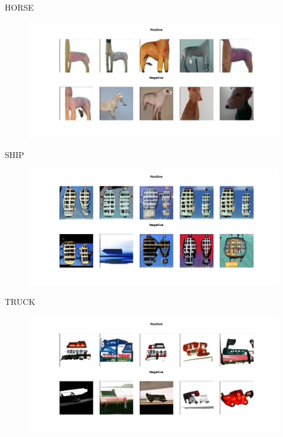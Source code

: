\documentclass[12pt,a4paper,openany]{book}
\begin{document}
\newline
HORSE
\begin{figure}[ht!]
    \centering
    \includegraphics[scale=0.4]{figs/cifar10_examples/horse.png}
\end{figure}
\newpage
\noindent SHIP
\begin{figure}[ht!]
    \centering
    \includegraphics[scale=0.4]{figs/cifar10_examples/ship.png}
\end{figure}
\newline
TRUCK
\begin{figure}[ht!]
    \centering
    \includegraphics[scale=0.4]{figs/cifar10_examples/truck.png}
\end{figure}
\end{document}
